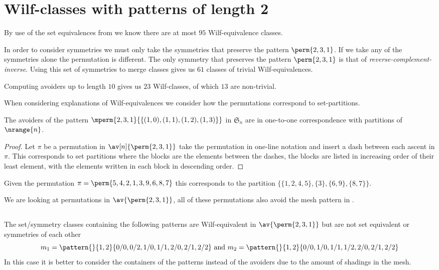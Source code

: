 \section{Wilf-classes with patterns of length 2}
By use of the set equivalences from  we know there are
at most \(95\) Wilf-equivalence classes.

In order to consider symmetries we must only take the symmetries that preserve
the pattern \(\perm{2,3,1}\). If we take any of the symmetries alone the
permutation is different. The only symmetry that preserves the pattern
\(\perm{2,3,1}\) is that of \emph{reverse-complement-inverse}. Using this
set of symmetries to merge classes gives us \(61\) classes of trivial
Wilf-equivalences.

Computing avoiders up to length \(10\) gives us \(23\) Wilf-classes,
of which \(13\) are non-trivial.

When considering explanations of Wilf-equivalences we consider how the
permutations correspond to set-partitions.

\begin{note}
    \label{not:setequiv}
    The avoiders of the pattern \(\mperm{2,3,1}{\{(1,0),(1,1),(1,2),(1,3)\}}\)
    in \(\mathfrak{S}_n\) are in one-to-one correspondence with partitions of
    \(\nrange{n}\). \cite{DBLP:journals/ejc/Claesson01}
\end{note}
\begin{proof}
    Let \(\pi\) be a permutation in \(\av[n]{\perm{2,3,1}}\) take the permutation
    in one-line notation and insert a dash between each ascent in \(\pi\). This
    corresponds to set partitions where the blocks are the elements between the
    dashes, the blocks are listed in increasing order of their least element,
    with the elements written in each block in descending order.
\end{proof}

\begin{example}
    Given the permutation \(\pi = \perm{5,4,2,1,3,9,6,8,7}\) this corresponds to the
    partition \(\{\{1,2,4,5\},\{3\},\{6,9\},\{8,7\}\}\).
\end{example}

We are looking at permutations in \(\av{\perm{2,3,1}}\), all of these permutations
also avoid the mesh pattern in .

\subsection{}
The set/symmetry classes containing the following patterns are
Wilf-equivalent in \(\av{\perm{2,3,1}}\) but are not set equivalent or
symmetries of each other
\begin{equation*}
    m_1 = \pattern{}{1,2}{0/0,0/2,
                    1/0,1/1,
                    2/0,2/1,2/2}
    \text{ and }
    m_2 = \pattern{}{1,2}{0/0,
                    1/0,1/1,1/2,
                    2/0,2/1,2/2}
\end{equation*}
In this case it is better to consider the containers of the patterns
instead of the avoiders due to the amount of shadings in the mesh.

